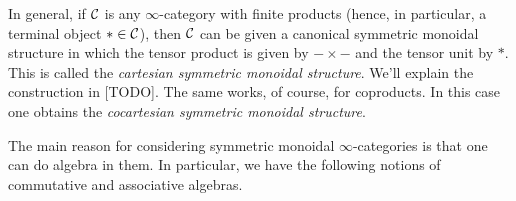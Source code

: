 \begin{exm}
\begin{alphanumerate}
		\item In general, if $\mathcal{C}$ is any $\infty$-category with finite products (hence, in particular, a terminal object $*\in\mathcal{C}$), then $\mathcal{C}$ can be given a canonical symmetric monoidal structure in which the tensor product is given by $-\times -$ and the tensor unit by $*$. This is called the \emph{cartesian symmetric monoidal structure}. We'll explain the construction in [TODO]. The same works, of course, for coproducts. In this case one obtains the \emph{cocartesian symmetric monoidal structure}.\label{enum:CartesianMonoidalStructure}
	\end{alphanumerate}
\end{exm}
The main reason for considering symmetric monoidal $\infty$-categories is that one can do algebra in them. In particular, we have the following notions of commutative and associative algebras.
